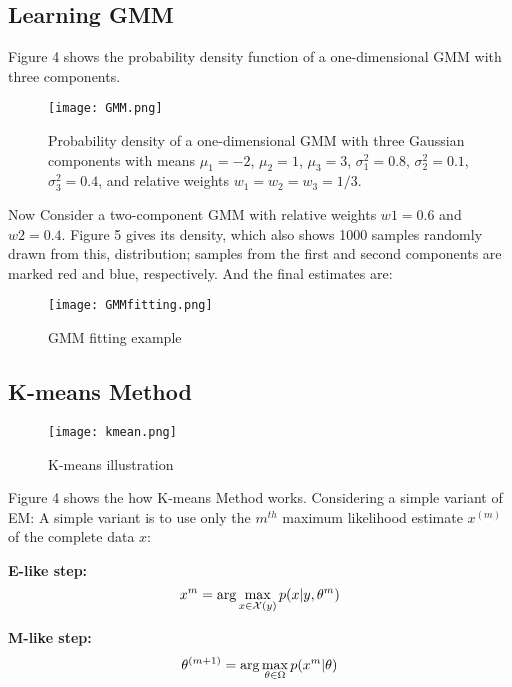 \documentclass[onecolumn,12pt]{IEEEtran}
\begin{document}
\subsection{Learning GMM}
Figure 4 shows the probability density function of a one-dimensional GMM with three components. 

\begin{figure}[!htb]
  \centering
  \texttt{[image: GMM.png]}
  \caption{Probability density of a one-dimensional GMM with three Gaussian components with means $\mu_1 = −2$, $\mu_2 = 1$, $\mu_3 = 3$, $\sigma_1^2 = 0.8$, $\sigma_2^2 = 0.1$, $\sigma_3^2 = 0.4$, and relative weights $w_1 = w_2 = w_3 = 1/3$.}
\end{figure}

Now Consider a two-component GMM with relative weights $w1 = 0.6$ and $w2 = 0.4$. Figure 5 gives its density, which also shows 1000 samples randomly drawn from this, distribution; samples from the first and second components are marked red and blue, respectively. And the final estimates are:

\begin{figure}[!htb]
  \centering
  \texttt{[image: GMMfitting.png]}
  \caption{GMM fitting example}
\end{figure}

\subsection{K-means Method}

\begin{figure}[!htb]
  \centering
  \texttt{[image: kmean.png]}
  \caption{K-means illustration}
\end{figure}

Figure 4 shows the how K-means Method works. Considering a simple variant of EM: A simple variant is to use only the $m^{th}$ maximum likelihood estimate $x^{(m)}$ of the complete data $x$:

\textbf{E-like step:}
\begin{equation}
  x^m = \arg\max_{x \in \mathcal{X}(y)} p(x|y,\theta^{m}) \\
\end{equation}

\textbf{M-like step:}
\begin{equation}
  \theta^{(m+1)} = \arg\max_{\theta \in \Omega} p(x^m|\theta) \\
\end{equation}
\end{document}

